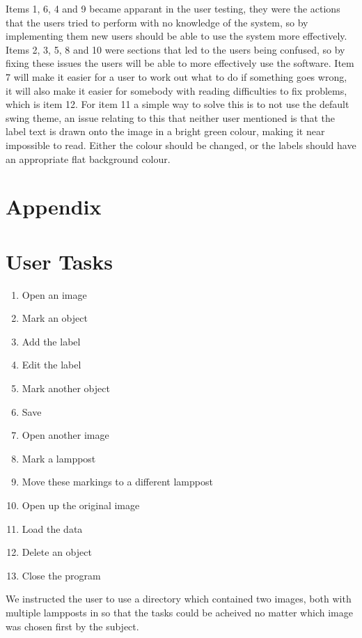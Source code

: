 \documentclass[a4paper,11pt,oneside]{article}
\begin{document}
Items 1, 6, 4 and 9 became apparant in the user testing, they were the actions that the users tried to perform with no knowledge of the system, so by implementing them new users should be able to use the system more effectively.  Items 2, 3, 5, 8 and 10 were sections that led to the users being confused, so by fixing these issues the users will be able to more effectively use the software.  Item 7 will make it easier for a user to work out what to do if something goes wrong, it will also make it easier for somebody with reading difficulties to fix problems, which is item 12.  For item 11 a simple way to solve this is to not use the default swing theme, an issue relating to this that neither user mentioned is that the label text is drawn onto the image in a bright green colour, making it near impossible to read.  Either the colour should be changed, or the labels should have an appropriate flat background colour.

\newpage
\section{Appendix}
\appendix

\section{User Tasks}
\label{sec:tasks}

\begin{enumerate}
    \item Open an image
    \item Mark an object
    \item Add the label
    \item Edit the label
    \item Mark another object
    \item Save
    \item Open another image
    \item Mark a lamppost
    \item Move these markings to a different lamppost
    \item Open up the original image
    \item Load the data
    \item Delete an object
    \item Close the program
\end{enumerate}

We instructed the user to use a directory which contained two images, both with multiple lampposts in so that the tasks could be acheived no matter which image was chosen first by the subject.
\end{document}
